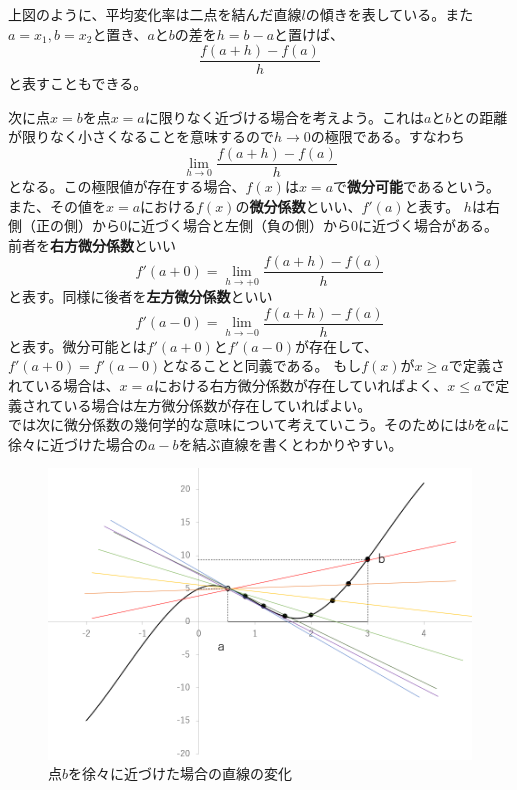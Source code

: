 \documentclass[a4j,dvipdfmx]{jsarticle}
\begin{document}
            上図のように、平均変化率は二点を結んだ直線$l$の傾きを表している。また$a=x_1,b=x_2$と置き、$a$と$b$の差を$h=b-a$と置けば、
            \begin{equation}
                \frac{f(a+h)-f(a)}{h}
            \end{equation}
            と表すこともできる。
            
            次に点$x=b$を点$x=a$に限りなく近づける場合を考えよう。これは$a$と$b$との距離が限りなく小さくなることを意味するので$h\to 0$の極限である。すなわち
            \begin{equation}
                \lim_{h\to 0}\frac{f(a+h)-f(a)}{h}
            \end{equation}
            となる。この極限値が存在する場合、$f(x)$は$x=a$で\textbf{微分可能}であるという。また、その値を$x=a$における$f(x)$の\textbf{微分係数}といい、$f'(a)$と表す。
            \clearpage
            $h$は右側（正の側）から0に近づく場合と左側（負の側）から0に近づく場合がある。
            前者を\textbf{右方微分係数}といい
            \begin{equation}
                f'(a+0)=\lim_{h\to +0}\frac{f(a+h)-f(a)}{h}
            \end{equation}
            と表す。同様に後者を\textbf{左方微分係数}といい
            \begin{equation}
                f'(a-0)=\lim_{h\to -0}\frac{f(a+h)-f(a)}{h}
            \end{equation}
            と表す。微分可能とは$f'(a+0)$と$f'(a-0)$が存在して、$f'(a+0)=f'(a-0)$となることと同義である。
            もし$f(x)$が$x\geq a$で定義されている場合は、$x=a$における右方微分係数が存在していればよく、$x\leq a$で定義されている場合は左方微分係数が存在していればよい。
            \\

            では次に微分係数の幾何学的な意味について考えていこう。そのためには$b$を$a$に徐々に近づけた場合の$a-b$を結ぶ直線を書くとわかりやすい。
            \begin{figure}[h]
                \centering
                \includegraphics[scale=0.5]{img/QuuNote/differentialCoefficieant_Graph.png}
                \caption{点$b$を徐々に近づけた場合の直線の変化}
            \end{figure}
\end{document}
